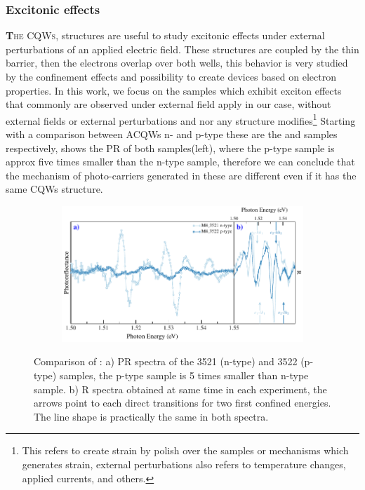 \subsubsection{Excitonic effects}
\label{subsubsec:chapter-3-PR-exciton-effects}
\vspace{-10mm} 
\lettrine[lines=3, lraise=.1, nindent=0mm, slope=0mm]{\textbf{T}}{he CQWs}, structures are useful to study excitonic effects under external perturbations of an applied electric field. These structures are coupled by the thin barrier, then the electrons overlap over both wells,  this behavior is very studied by the confinement effects and possibility to create devices based on electron properties.  In this work, we focus on the samples which exhibit exciton effects that commonly are observed under external field apply in our case, without external fields or external perturbations and nor any structure modifies\footnote{This refers to create strain by polish over the samples or mechanisms which generates strain, external perturbations also refers to temperature changes, applied currents, and others.} Starting with a comparison between ACQWs n- and p-type these are the  and  samples respectively,  shows the PR of both samples(left), where the p-type sample is approx five times smaller than the n-type sample, therefore we can conclude that the mechanism of photo-carriers generated in these are different even if it has the same CQWs structure.   

\begin{figure}[ht!]
	\centering
\begin{subfigure}{\textwidth}
	\includegraphics[width=\textwidth]{../figures/chapter-3/pr-plots/build/pr-set3.pdf}
	\label{fig:chapter-3-PR-PLOT-SET3-a)}
	\label{fig:chapter-3-PR-PLOT-SET3-b)}
\end{subfigure}
	\caption{Comparison of : a) PR spectra of the 3521 (n-type) and 3522 (p-type) samples, the p-type sample is 5 times smaller than n-type sample. b) R spectra obtained at same time in each experiment, the arrows point to each direct transitions for two first confined energies. The line shape is practically the same in both spectra.} 
	\label{fig:chapter-3-PR-PLOT-SET3}
\end{figure}


